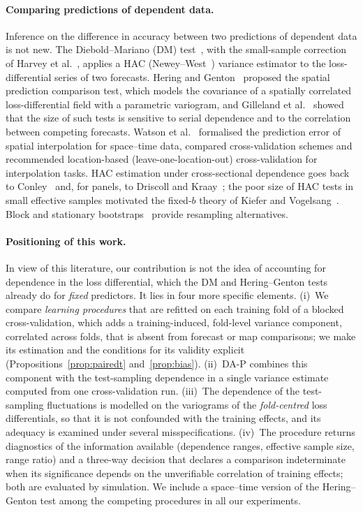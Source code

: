 \paragraph{Comparing predictions of dependent data.}
Inference on the difference in accuracy between two predictions of dependent data is not new. The Diebold--Mariano (DM) test~\cite{diebold1995}, with the small-sample correction of Harvey et al.~\cite{harvey1997}, applies a HAC (Newey--West~\cite{newey1987}) variance estimator to the loss-differential series of two forecasts. Hering and Genton~\cite{hering2011} proposed the spatial prediction comparison test, which models the covariance of a spatially correlated loss-differential field with a parametric variogram, and Gilleland et al.~\cite{gilleland2018} showed that the size of such tests is sensitive to serial dependence and to the correlation between competing forecasts. Watson et al.~\cite{watson2024} formalised the prediction error of spatial interpolation for space--time data, compared cross-validation schemes and recommended location-based (leave-one-location-out) cross-validation for interpolation tasks. HAC estimation under cross-sectional dependence goes back to Conley~\cite{conley1999} and, for panels, to Driscoll and Kraay~\cite{driscoll1998}; the poor size of HAC tests in small effective samples motivated the fixed-$b$ theory of Kiefer and Vogelsang~\cite{kiefer2005}. Block and stationary bootstraps~\cite{kunsch1989,politis1994,lahiri2003} provide resampling alternatives.

\paragraph{Positioning of this work.}
In view of this literature, our contribution is not the idea of accounting for dependence in the loss differential, which the DM and Hering--Genton tests already do for \emph{fixed} predictors. It lies in four more specific elements. (i)~We compare \emph{learning procedures} that are refitted on each training fold of a blocked cross-validation, which adds a training-induced, fold-level variance component, correlated across folds, that is absent from forecast or map comparisons; we make its estimation and the conditions for its validity explicit (Propositions~\ref{prop:pairedt} and~\ref{prop:bias}). (ii)~DA-P combines this component with the test-sampling dependence in a single variance estimate computed from one cross-validation run. (iii)~The dependence of the test-sampling fluctuations is modelled on the variograms of the \emph{fold-centred} loss differentials, so that it is not confounded with the training effects, and its adequacy is examined under several misspecifications. (iv)~The procedure returns diagnostics of the information available (dependence ranges, effective sample size, range ratio) and a three-way decision that declares a comparison indeterminate when its significance depends on the unverifiable correlation of training effects; both are evaluated by simulation. We include a space--time version of the Hering--Genton test among the competing procedures in all our experiments.

